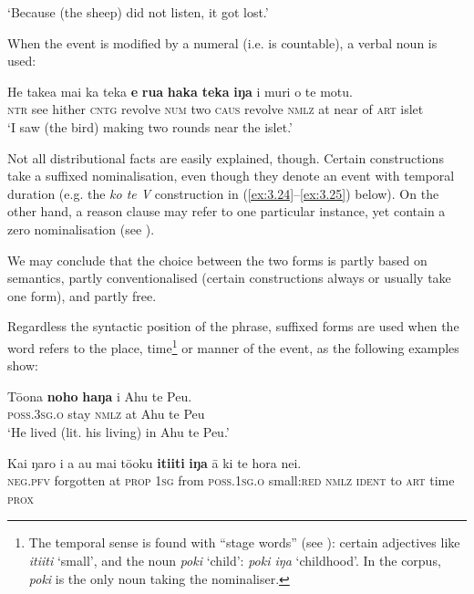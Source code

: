 \glt
‘Because (the sheep) did not listen, it got lost.’ \textstyleExampleref{[R490.005]} 
\z

When the event is modified by a numeral (i.e. is countable), a verbal noun is used:

\ea\label{ex:3.18}
\gll He take{\ꞌ}a mai ka teka \textbf{e} \textbf{rua} \textbf{haka} \textbf{teka} \textbf{iŋa} {\ꞌ}i muri o te motu. \\
\textsc{ntr} see hither \textsc{cntg} revolve \textsc{num} two \textsc{caus} revolve \textsc{nmlz} at near of \textsc{art} islet \\

\glt
‘I saw (the bird) making two rounds near the islet.’ \textstyleExampleref{[R338.014]} 
\z

Not all distributional facts are easily explained, though. Certain constructions take a suffixed nominalisation, even though they denote an event with temporal duration (e.g. the \textit{ko te V} construction in (\ref{ex:3.24}–\ref{ex:3.25}) below). On the other hand, a reason clause may refer to one particular instance, yet contain a zero nominalisation (see ). 

We may conclude that the choice between the two forms is partly based on semantics, partly conventionalised (certain constructions always or usually take one form), and partly free.

Regardless the syntactic position of the phrase, suffixed forms are used when the word refers to the place, time\footnote{\label{fn:107}The temporal sense is found with “stage words” (see \citealt[148]{Broschart1997}): certain adjectives like \textit{{\ꞌ}iti{\ꞌ}iti} ‘small’, and the noun \textit{poki} ‘child’: \textit{poki iŋa} ‘childhood’. In the corpus, \textit{poki} is the only noun taking the nominaliser.}  or manner of the event, as the following examples show:

\ea\label{ex:3.19}
\gll Tō{\ꞌ}ona \textbf{noho} \textbf{haŋa} {\ꞌ}i Ahu te Peu.\\
\textsc{poss.3sg.o} stay \textsc{nmlz} at Ahu te Peu\\

\glt 
‘He lived (lit. his living) in Ahu te Peu.’ \textstyleExampleref{[R233.002]} 
\z

\ea\label{ex:3.20}
\gll Kai ŋaro i a au mai tō{\ꞌ}oku \textbf{{\ꞌ}iti{\ꞌ}iti} \textbf{iŋa} {\ꞌ}ā ki te hora nei.\\
\textsc{neg.pfv} forgotten at \textsc{prop} \textsc{1sg} from \textsc{poss.1sg.o} small:\textsc{red} \textsc{nmlz} \textsc{ident} to \textsc{art} time \textsc{prox}\\

